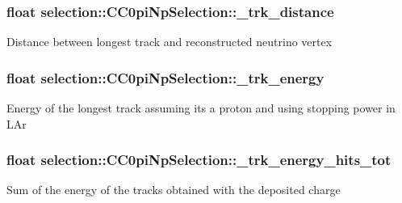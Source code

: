 \subsubsection[{\texorpdfstring{\+\_\+trk\+\_\+distance}{_trk_distance}}]{\setlength{\rightskip}{0pt plus 5cm}float selection\+::\+C\+C0pi\+Np\+Selection\+::\+\_\+trk\+\_\+distance\hspace{0.3cm}{\ttfamily [private]}}\hypertarget{classselection_1_1CC0piNpSelection_a0f16777192fbed04bcc67edfdfa67e6b}{}\label{classselection_1_1CC0piNpSelection_a0f16777192fbed04bcc67edfdfa67e6b}
Distance between longest track and reconstructed neutrino vertex 
\subsubsection[{\texorpdfstring{\+\_\+trk\+\_\+energy}{_trk_energy}}]{\setlength{\rightskip}{0pt plus 5cm}float selection\+::\+C\+C0pi\+Np\+Selection\+::\+\_\+trk\+\_\+energy\hspace{0.3cm}{\ttfamily [private]}}\hypertarget{classselection_1_1CC0piNpSelection_a98e03f33f34b5df397a1d1144b1de4a1}{}\label{classselection_1_1CC0piNpSelection_a98e03f33f34b5df397a1d1144b1de4a1}
Energy of the longest track assuming it\textquotesingle{}s a proton and using stopping power in L\+Ar 
\subsubsection[{\texorpdfstring{\+\_\+trk\+\_\+energy\+\_\+hits\+\_\+tot}{_trk_energy_hits_tot}}]{\setlength{\rightskip}{0pt plus 5cm}float selection\+::\+C\+C0pi\+Np\+Selection\+::\+\_\+trk\+\_\+energy\+\_\+hits\+\_\+tot\hspace{0.3cm}{\ttfamily [private]}}\hypertarget{classselection_1_1CC0piNpSelection_a82a48c6128c34252642d237b98f1b66a}{}\label{classselection_1_1CC0piNpSelection_a82a48c6128c34252642d237b98f1b66a}
Sum of the energy of the tracks obtained with the deposited charge 
